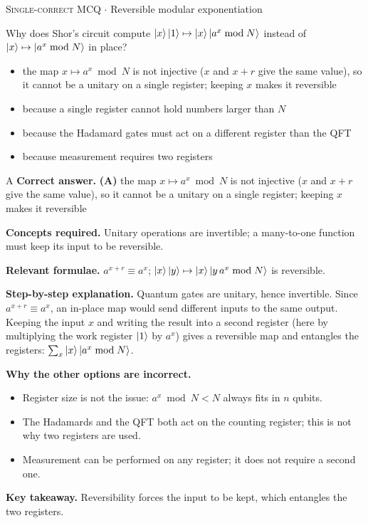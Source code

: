 \documentclass[11pt,a4paper]{article}
\newcommand{\optlabel}[1]{\textbf{(#1)}}
\newcommand{\correctlabel}[1]{\textcolor{okgreen}{\textbf{(#1)}\,\ding{51}}}
\newenvironment{qitem}[1]{\begin{list}{}{\setlength{\leftmargin}{3.3em}\setlength{\labelwidth}{3.1em}%
  \setlength{\labelsep}{0.2em}\setlength{\topsep}{3pt}\setlength{\parsep}{3pt}}\item[\textbf{Q.#1}\hfill]}{\end{list}}
\newcommand{\qsep}{\par\vspace{2pt}{\color{black!15}\hrule}\vspace{4pt}}
\newcommand{\qmeta}[2]{{\footnotesize\color{black!60}\textsc{#1} \;$\cdot$\; #2}\par}
\begin{document}
\begin{qitem}{30}
\qmeta{Single-correct MCQ}{Reversible modular exponentiation}
Why does Shor's circuit compute $\ket x\ket1 \mapsto \ket x\ket{a^x \bmod N}$ instead of $\ket x \mapsto \ket{a^x \bmod N}$ in place?
\begin{itemize}[leftmargin=2.6em, labelsep=0.4em, itemsep=2pt, topsep=3pt]
\item[\correctlabel{A}] the map $x \mapsto a^x \bmod N$ is not injective ($x$ and $x + r$ give the same value), so it cannot be a unitary on a single register; keeping $x$ makes it reversible
\item[\optlabel{B}] because a single register cannot hold numbers larger than $N$
\item[\optlabel{C}] because the Hadamard gates must act on a different register than the QFT
\item[\optlabel{D}] because measurement requires two registers
\end{itemize}
\end{qitem}
\begin{solbox}{A}
\textbf{\color{brand}Correct answer.} \textcolor{okgreen}{\textbf{(A)}} the map $x \mapsto a^x \bmod N$ is not injective ($x$ and $x + r$ give the same value), so it cannot be a unitary on a single register; keeping $x$ makes it reversible

\textbf{\color{brand}Concepts required.} Unitary operations are invertible; a many-to-one function must keep its input to be reversible.

\textbf{\color{brand}Relevant formulae.} $a^{x + r} \equiv a^x$; $\ket x\ket y \mapsto \ket x\ket{y\,a^x \bmod N}$ is reversible.

\textbf{\color{brand}Step-by-step explanation.} Quantum gates are unitary, hence invertible. Since $a^{x + r} \equiv a^x$, an in-place map would send different inputs to the same output. Keeping the input
$x$ and writing the result into a second register (here by multiplying the work register $\ket1$ by $a^x$) gives a reversible map and entangles the
registers: $\sum_x\ket x\ket{a^x \bmod N}$.

\textbf{\color{brand}Why the other options are incorrect.}
\begin{itemize}[leftmargin=2.4em, itemsep=1pt, topsep=2pt]
\item[\textbf{(B)}] Register size is not the issue: $a^x \bmod N < N$ always fits in $n$ qubits.
\item[\textbf{(C)}] The Hadamards and the QFT both act on the counting register; this is not why two registers are used.
\item[\textbf{(D)}] Measurement can be performed on any register; it does not require a second one.
\end{itemize}
\textbf{\color{brand}Key takeaway.} Reversibility forces the input to be kept, which entangles the two registers.
\end{solbox}
\qsep
\end{document}
